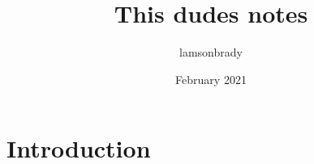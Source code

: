 \documentclass{article}
\title{This dudes notes}
\author{lamsonbrady }
\date{February 2021}
\begin{document}
\maketitle

\section{Introduction}
\end{document}
